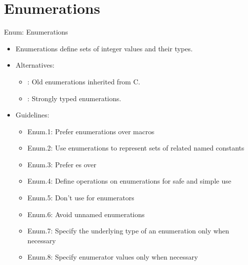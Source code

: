 \section{Enumerations}

\begin{frame}[t]{Enum: Enumerations}
\begin{itemize}
  \item Enumerations define sets of integer values and their types.
  \item Alternatives:
    \begin{itemize}
      \item {}: Old enumerations inherited from C.
      \item {}: Strongly typed enumerations.
    \end{itemize}

  \item Guidelines:
    \begin{itemize}
      \item Enum.1: Prefer enumerations over macros
      \item Enum.2: Use enumerations to represent sets of related named constants
      \item Enum.3: Prefer es over  
      \item Enum.4: Define operations on enumerations for safe and simple use
      \item Enum.5: Don’t use  for enumerators
      \item Enum.6: Avoid unnamed enumerations
      \item Enum.7: Specify the underlying type of an enumeration only when necessary
      \item Enum.8: Specify enumerator values only when necessary
    \end{itemize}
\end{itemize}
\end{frame}
